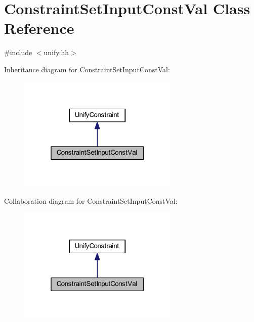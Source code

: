 \hypertarget{class_constraint_set_input_const_val}{}\section{Constraint\+Set\+Input\+Const\+Val Class Reference}
\label{class_constraint_set_input_const_val}


{\ttfamily \#include $<$unify.\+hh$>$}



Inheritance diagram for Constraint\+Set\+Input\+Const\+Val\+:
\nopagebreak
\begin{figure}[H]
\begin{center}
\leavevmode
\includegraphics[width=217pt]{class_constraint_set_input_const_val__inherit__graph}
\end{center}
\end{figure}


Collaboration diagram for Constraint\+Set\+Input\+Const\+Val\+:
\nopagebreak
\begin{figure}[H]
\begin{center}
\leavevmode
\includegraphics[width=217pt]{class_constraint_set_input_const_val__coll__graph}
\end{center}
\end{figure}

